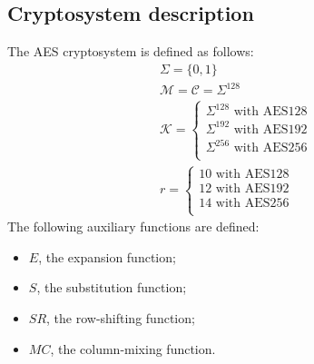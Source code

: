 \subsection{Cryptosystem description}
The AES cryptosystem is defined as follows:
\begin{align*}
    \Sigma = \{0,1\} \\
    \mathcal{M} = \mathcal{C} = \Sigma^{128}\\
    \mathcal{K} =
    \begin{cases}
        \Sigma^{128} \text{ with AES128}\\
        \Sigma^{192} \text{ with AES192}\\
        \Sigma^{256} \text{ with AES256}\\
    \end{cases}\\
    r =
    \begin{cases}
        10 \text{ with AES128}\\
        12 \text{ with AES192}\\
        14 \text{ with AES256}\\
    \end{cases}
\end{align*}
The following auxiliary functions are defined:
\begin{itemize}
    \item $E$, the expansion function;
    \item $S$, the substitution function;
    \item $SR$, the row-shifting function;
    \item $MC$, the column-mixing function.
\end{itemize}

